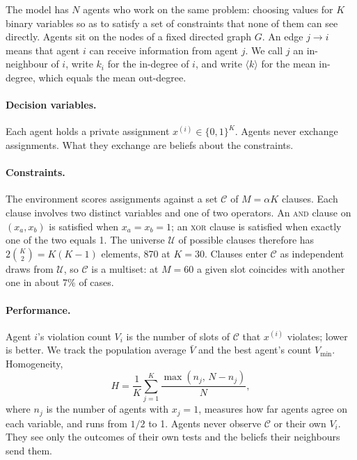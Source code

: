 \documentclass[11pt]{article}
\begin{document}
The model has $N$ agents who work on the same problem: choosing values for $K$ binary variables so as to satisfy a set of constraints that none of them can see directly. Agents sit on the nodes of a fixed directed graph $G$. An edge $j \to i$ means that agent $i$ can receive information from agent $j$. We call $j$ an in-neighbour of $i$, write $k_i$ for the in-degree of $i$, and write $\langle k\rangle$ for the mean in-degree, which equals the mean out-degree.

\paragraph{Decision variables.} Each agent holds a private assignment $x^{(i)} \in \{0,1\}^K$. Agents never exchange assignments. What they exchange are beliefs about the constraints.

\paragraph{Constraints.} The environment scores assignments against a set $\mathcal{C}$ of $M = \alpha K$ clauses. Each clause involves two distinct variables and one of two operators. An \textsc{and} clause on $(x_a, x_b)$ is satisfied when $x_a = x_b = 1$; an \textsc{xor} clause is satisfied when exactly one of the two equals 1. The universe $\mathcal{U}$ of possible clauses therefore has $2\binom{K}{2} = K(K-1)$ elements, 870 at $K = 30$. Clauses enter $\mathcal{C}$ as independent draws from $\mathcal{U}$, so $\mathcal{C}$ is a multiset: at $M = 60$ a given slot coincides with another one in about 7\% of cases.

\paragraph{Performance.} Agent $i$'s violation count $V_i$ is the number of slots of $\mathcal{C}$ that $x^{(i)}$ violates; lower is better. We track the population average $\bar V$ and the best agent's count $V_{\min}$. Homogeneity,
\[
H = \frac{1}{K} \sum_{j=1}^{K} \frac{\max(n_j,\, N-n_j)}{N},
\]
where $n_j$ is the number of agents with $x_j = 1$, measures how far agents agree on each variable, and runs from $1/2$ to 1. Agents never observe $\mathcal{C}$ or their own $V_i$. They see only the outcomes of their own tests and the beliefs their neighbours send them.
\end{document}
